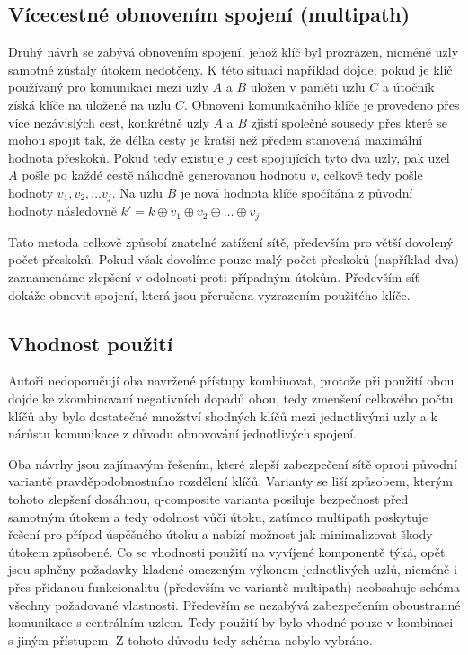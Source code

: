 \documentclass[11pt,final,twoside]{fithesis2}
\begin{document}
\subsection{Vícecestné obnovením spojení (multipath)}
Druhý návrh \cite{Svenda2009} se zabývá obnovením spojení, jehož klíč byl prozrazen, nicméně uzly samotné zůstaly útokem nedotčeny. K této situaci například dojde, pokud je klíč používaný pro komunikaci mezi
uzly $A$ a $B$ uložen v paměti uzlu $C$ a útočník získá klíče na uložené na uzlu $C$. Obnovení komunikačního klíče je provedeno přes více nezávislých cest, konkrétně uzly $A$ a $B$ zjistí společné sousedy
přes které se mohou spojit tak, že délka cesty je kratší než předem stanovená maximální hodnota přeskoků. Pokud tedy existuje $j$ cest spojujících tyto dva uzly, pak uzel $A$ pošle po každé cestě náhodně 
generovanou hodnotu $v$, celkově tedy pošle hodnoty $v_1, v_2, \dots v_j$. Na uzlu $B$ je nová hodnota klíče spočítána z původní hodnoty následovně $k' = k \oplus v_1 \oplus v_2 \oplus \dots \oplus v_j$

Tato metoda celkově způsobí znatelné zatížení sítě, především pro větší dovolený počet přeskoků. Pokud však dovolíme pouze malý počet přeskoků (například dva) zaznamenáme zlepšení v odolnosti proti 
případným útokům. Především síť dokáže obnovit spojení, která jsou přerušena vyzrazením použitého klíče.

\subsection{Vhodnost použití}
Autoři nedoporučují oba navržené přístupy kombinovat, protože při použití obou dojde ke zkombinovaní negativních dopadů obou, tedy zmenšení celkového počtu klíčů aby bylo dostatečné množství shodných
klíčů mezi jednotlivými uzly a k nárůstu komunikace z důvodu obnovování jednotlivých spojení. 

Oba návrhy jsou zajímavým řešením, které zlepší zabezpečení sítě oproti původní variantě pravděpodobnostního rozdělení klíčů. Varianty se liší způsobem, kterým tohoto zlepšení dosáhnou, q-composite 
varianta posiluje bezpečnost před samotným útokem a tedy odolnost vůči útoku, zatímco multipath poskytuje řešení pro případ úspěšného útoku a nabízí možnost jak minimalizovat škody útokem způsobené.
Co se vhodnosti použití na vyvíjené komponentě týká, opět jsou splněny požadavky kladené omezeným výkonem jednotlivých uzlů, nicméně i přes přidanou funkcionalitu (především ve 
variantě multipath) neobsahuje schéma všechny požadované vlastnosti. Především se nezabývá zabezpečením oboustranné komunikace s centrálním uzlem. Tedy použití by bylo vhodné pouze v kombinaci 
s jiným přístupem. Z tohoto důvodu tedy schéma nebylo vybráno. 
\end{document}
